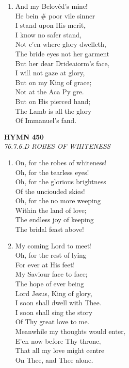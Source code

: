 \documentclass[11pt,a4paper]{article}
\begin{document}
\begin{enumerate}
    \item And my Belovéd's mine! \\
        He bein \# poor vile sinner \\
        I stand upon His merit, \\
        I know no safer stand, \\
        Not e'en where glory dwelleth, \\
        The bride eyes not her garment \\
        But her dear Drideaiorm's face, \\
        I will not gaze at glory, \\
        But on my King of grace; \\
        Not at the Aca Py gre. \\
        But on His pierced hand; \\
        The Lamb is all the glory \\
        Of Immanuel's fand.

\end{enumerate}

\newpage
\begin{center}
    {\Large \textbf{HYMN 450}}
    \\
    \textit{76.7.6.D ROBES OF WHITENESS}
\end{center}
\vspace{1em}

\begin{enumerate}
    \item On, for the robes of whiteness! \\
        Oh, for the tearless eyes! \\
        Oh, for the glorious brightness \\
        Of the unciouded skies! \\
        Oh, for the no more weeping \\
        Within the land of love; \\
        The endless joy of keeping \\
        The bridal feast above!

    \item My coming Lord to meet! \\
        Oh, for the rest of lying \\
        For ever at His feet! \\
        My Saviour face to face; \\
        The hope of ever being \\
        Lord Jesus, King of glory, \\
        I soon shall dwell with Thee. \\
        I soon shall sing the story \\
        Of Thy great love to me. \\
        Meanwhile my thoughts would enter, \\
        E'en now before Thy throne, \\
        That all my love might centre \\
        On Thee, and Thee alone.

\end{enumerate}
\end{document}
